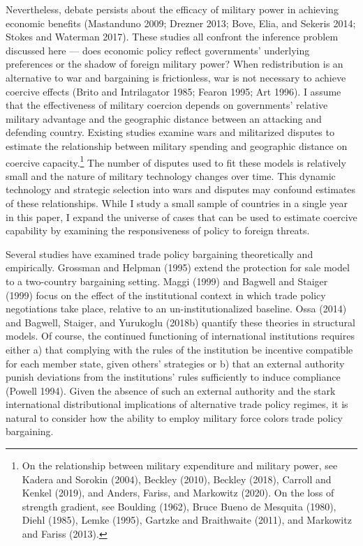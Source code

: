 \documentclass{puthesis}
\begin{document}
Nevertheless, debate persists about the efficacy of military power in
achieving economic benefits (Mastanduno 2009; Drezner 2013; Bove, Elia,
and Sekeris 2014; Stokes and Waterman 2017). These studies all confront
the inference problem discussed here --- does economic policy reflect
governments' underlying preferences or the shadow of foreign military
power? When redistribution is an alternative to war and bargaining is
frictionless, war is not necessary to achieve coercive effects (Brito
and Intrilagator 1985; Fearon 1995; Art 1996). I assume that the
effectiveness of military coercion depends on governments' relative
military advantage and the geographic distance between an attacking and
defending country. Existing studies examine wars and militarized
disputes to estimate the relationship between military spending and
geographic distance on coercive capacity.\footnote{On the relationship
  between military expenditure and military power, see Kadera and
  Sorokin (2004), Beckley (2010), Beckley (2018), Carroll and Kenkel
  (2019), and Anders, Fariss, and Markowitz (2020). On the loss of
  strength gradient, see Boulding (1962), Bruce Bueno de Mesquita
  (1980), Diehl (1985), Lemke (1995), Gartzke and Braithwaite (2011),
  and Markowitz and Fariss (2013).} The number of disputes used to fit
these models is relatively small and the nature of military technology
changes over time. This dynamic technology and strategic selection into
wars and disputes may confound estimates of these relationships. While I
study a small sample of countries in a single year in this paper, I
expand the universe of cases that can be used to estimate coercive
capability by examining the responsiveness of policy to foreign threats.

Several studies have examined trade policy bargaining theoretically and
empirically. Grossman and Helpman (1995) extend the protection for sale
model to a two-country bargaining setting. Maggi (1999) and Bagwell and
Staiger (1999) focus on the effect of the institutional context in which
trade policy negotiations take place, relative to an
un-institutionalized baseline. Ossa (2014) and Bagwell, Staiger, and
Yurukoglu (2018b) quantify these theories in structural models. Of
course, the continued functioning of international institutions requires
either a) that complying with the rules of the institution be incentive
compatible for each member state, given others' strategies or b) that an
external authority punish deviations from the institutions' rules
sufficiently to induce compliance (Powell 1994). Given the absence of
such an external authority and the stark international distributional
implications of alternative trade policy regimes, it is natural to
consider how the ability to employ military force colors trade policy
bargaining.
\end{document}
